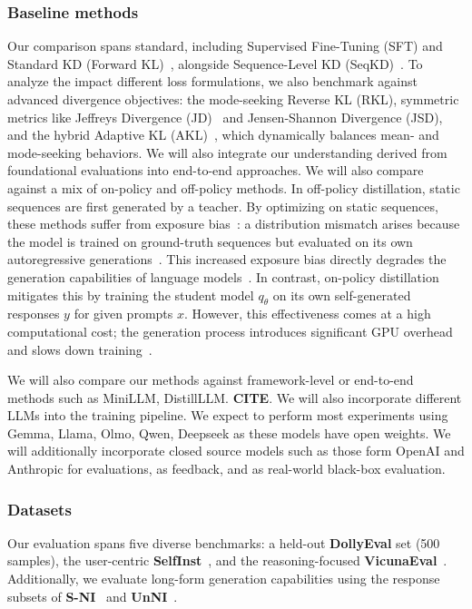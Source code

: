 \subsubsection{Baseline methods} Our comparison spans standard, including Supervised Fine-Tuning (SFT) and Standard KD (Forward KL)~\cite{hinton2015distilling}, alongside Sequence-Level KD (SeqKD)~\cite{kim2016sequence}. 
To analyze the impact different loss formulations, we also benchmark against advanced divergence objectives: the mode-seeking Reverse KL (RKL), symmetric metrics like Jeffreys Divergence (JD)~\cite{jeffreys1948theory} and Jensen-Shannon Divergence (JSD), and the hybrid Adaptive KL (AKL)~\cite{wu2024rethinking}, which dynamically balances mean- and mode-seeking behaviors. We will also integrate our understanding derived from foundational evaluations into end-to-end approaches. We will also compare against a mix of on-policy and off-policy methods. In off-policy distillation, static sequences are first generated by a teacher. By optimizing on static sequences, these methods suffer from exposure bias~\cite{arora2022exposure}: a distribution mismatch arises because the model is trained on ground-truth sequences but evaluated on its own autoregressive generations~\cite{gu2024minillm}. 
This increased exposure bias directly degrades the generation capabilities of language models~\cite{arora2022exposure}. 
In contrast, on-policy distillation~\cite{gu2024minillm,agarwal2024onpolicy} mitigates this by training the student model $q_\theta$ on its own self-generated responses $y$ for given prompts $x$. 
However, this effectiveness comes at a high computational cost; the generation process introduces significant GPU overhead and slows down training~\cite{ko2024distillm,kodistillm}.

We will also compare our methods against framework-level or end-to-end methods such as MiniLLM, DistillLLM. \textbf{CITE}. We will also incorporate different LLMs into the training pipeline. We expect to perform most experiments using Gemma, Llama, Olmo, Qwen, Deepseek as these models have open weights. We will additionally incorporate closed source models such as those form OpenAI and Anthropic for evaluations, as feedback, and as real-world black-box evaluation. 

\subsubsection{Datasets}
Our evaluation spans five diverse benchmarks: a held-out \textbf{DollyEval} set (500 samples), the user-centric \textbf{SelfInst}~\cite{wang2023self}, and the reasoning-focused \textbf{VicunaEval}~\cite{zheng2023judging}. Additionally, we evaluate long-form generation capabilities using the  response subsets of \textbf{S-NI}~\cite{wang2022super} and \textbf{UnNI}~\cite{honovich2023unnatural}.


